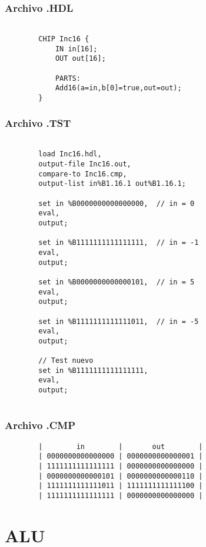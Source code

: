 \documentclass[12pt]{article}
\begin{document}
	\subsubsection{Archivo .HDL}
	\begin{lstlisting}

		CHIP Inc16 {
			IN in[16];
			OUT out[16];

			PARTS:
			Add16(a=in,b[0]=true,out=out);
		}
	\end{lstlisting}
	\subsubsection{Archivo .TST}
	\begin{lstlisting}

		load Inc16.hdl,
		output-file Inc16.out,
		compare-to Inc16.cmp,
		output-list in%B1.16.1 out%B1.16.1;

		set in %B0000000000000000,  // in = 0
		eval,
		output;

		set in %B1111111111111111,  // in = -1
		eval,
		output;

		set in %B0000000000000101,  // in = 5
		eval,
		output;

		set in %B1111111111111011,  // in = -5
		eval,
		output;

		// Test nuevo
		set in %B1111111111111111,
		eval,
		output;


	\end{lstlisting}

	\subsubsection{Archivo .CMP}
	\begin{lstlisting}
		|        in        |       out        |
		| 0000000000000000 | 0000000000000001 |
		| 1111111111111111 | 0000000000000000 |
		| 0000000000000101 | 0000000000000110 |
		| 1111111111111011 | 1111111111111100 |
		| 1111111111111111 | 0000000000000000 |
	\end{lstlisting}
	\newpage
	\section{ALU}
\end{document}
